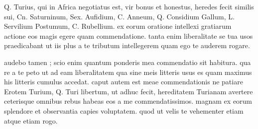 


 Q. Turius, qui in Africa negotiatus est, vir bonus et honestus, heredes fecit similis sui, Cn. Saturninum, Sex. Aufidium, C. Anneum, Q. Considium Gallum, L. Servilium Postumum, C. Rubellium. ex eorum oratione intellexi gratiarum actione eos magis egere quam commendatione. tanta enim liberalitate se tua usos praedicabant ut iis plus a te tributum intellegerem quam ego te auderem rogare.

 audebo tamen ; scio enim quantum ponderis mea commendatio sit habitura. qua re a te peto ut ad eam liberalitatem qua sine meis litteris usus es quam maximus his litteris cumulus accedat. caput autem est meae commendationis ne patiare Erotem Turium, Q. Turi libertum, ut adhuc fecit, hereditatem Turianam avertere ceterisque omnibus rebus habeas eos a me commendatissimos. magnam ex eorum splendore et observantia capies voluptatem. quod ut velis te vehementer etiam atque etiam rogo.
